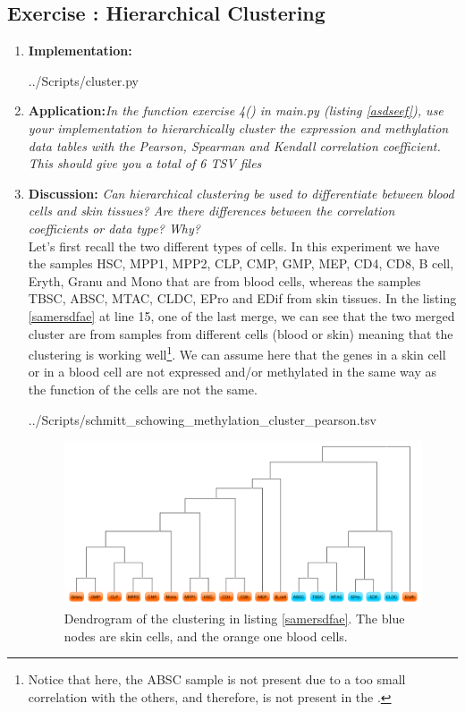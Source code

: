 \documentclass[10pt,a4paper]{article}
\newcommand{\exercise}[1]
{
  \stepcounter{subsection}
  \subsection*{Exercise \thesubsection: #1}

}
\begin{document}
\newpage
\exercise{Hierarchical Clustering}
\begin{enumerate}
	
	\item \textbf{Implementation: }
	
	 {../Scripts/cluster.py}
	
	\item \textbf{Application:}\textit{In the function exercise 4() in main.py (listing \ref{asdseef}), use your implementation to hierarchically cluster the expression and methylation data tables with the Pearson, Spearman and Kendall correlation coefficient. This should give you a total of 6 TSV files}\\
	
	
	\item \textbf{Discussion: }\textit{Can hierarchical clustering be used to differentiate between blood cells and skin tissues? Are there differences between the correlation coefficients or data type? Why?}\\
	
	Let's first recall the two different types of cells. In this experiment we have the samples HSC, MPP1, MPP2, CLP, CMP, GMP, MEP, CD4, CD8, B cell, Eryth, Granu and Mono that are from blood cells, whereas the samples TBSC, ABSC, MTAC, CLDC, EPro and EDif from skin tissues. In the listing \ref{samersdfae} at line 15, one of the last merge, we can see that the two merged cluster are from samples from different cells (blood or skin) meaning that the clustering is working well\footnote{Notice that here, the ABSC sample is not present due to a too small correlation with the others, and therefore, is not present in the .}. We can assume here that the genes in a skin cell or in a blood cell are not expressed and/or methylated in the same way as the function of the cells are not the same. 
	
	 {../Scripts/schmitt\string_schowing\string_methylation\string_cluster\string_pearson.tsv}
	
	
	\begin{figure}[H]
		\centering
		\includegraphics[width=\paperwidth, angle=90]{img/clustering_methylation_pearson_dendrogram}
		\caption{Dendrogram of the clustering in listing \ref{samersdfae}. The blue nodes are skin cells, and the orange one blood cells.}
		\label{fig:clusteringmethylationpearsondendrogram}
	\end{figure}
	

	
\end{enumerate}
\end{document}
